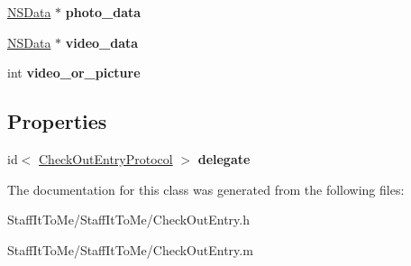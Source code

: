 \begin{DoxyCompactItemize}
\item 
\hypertarget{interface_check_out_entry_a2fb127841ba0567dc8d89b278e8f8975}{
\hyperlink{class_n_s_data}{\-N\-S\-Data} $\ast$ {\bfseries photo\-\_\-data}}
\label{interface_check_out_entry_a2fb127841ba0567dc8d89b278e8f8975}

\item 
\hypertarget{interface_check_out_entry_a31fe001006f2e309753441d96e2abe16}{
\hyperlink{class_n_s_data}{\-N\-S\-Data} $\ast$ {\bfseries video\-\_\-data}}
\label{interface_check_out_entry_a31fe001006f2e309753441d96e2abe16}

\item 
\hypertarget{interface_check_out_entry_acccfa0fcff23a6e8eb89f7a99f77b28e}{
int {\bfseries video\-\_\-or\-\_\-picture}}
\label{interface_check_out_entry_acccfa0fcff23a6e8eb89f7a99f77b28e}

\end{DoxyCompactItemize}
\subsection*{\-Properties}
\begin{DoxyCompactItemize}
\item 
\hypertarget{interface_check_out_entry_a5cacf70762ab02d91cfa237b5a14536a}{
id$<$ \hyperlink{protocol_check_out_entry_protocol-p}{\-Check\-Out\-Entry\-Protocol} $>$ {\bfseries delegate}}
\label{interface_check_out_entry_a5cacf70762ab02d91cfa237b5a14536a}

\end{DoxyCompactItemize}


\-The documentation for this class was generated from the following files\-:\begin{DoxyCompactItemize}
\item 
\-Staff\-It\-To\-Me/\-Staff\-It\-To\-Me/\-Check\-Out\-Entry.\-h\item 
\-Staff\-It\-To\-Me/\-Staff\-It\-To\-Me/\-Check\-Out\-Entry.\-m\end{DoxyCompactItemize}
